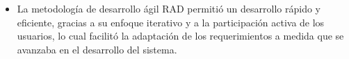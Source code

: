 \begin{itemize}
    \item La metodología de desarrollo ágil RAD permitió un desarrollo rápido y eficiente, gracias a su enfoque iterativo
          y a la participación activa de los usuarios, lo cual facilitó la adaptación de los requerimientos a medida que se
          avanzaba en el desarrollo del sistema.

\end{itemize}